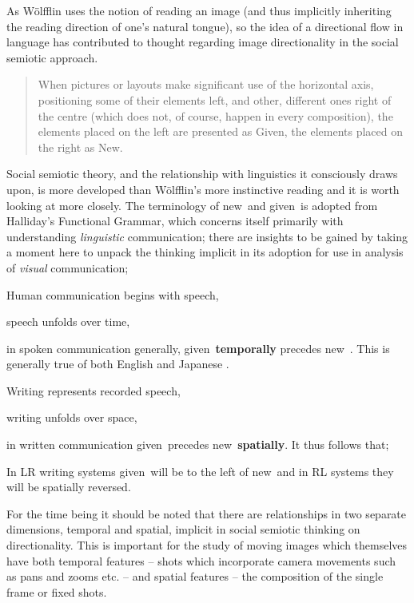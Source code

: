 \documentclass[11pt, oneside, a4paper]{scrartcl}
\newcommand{\nw} {{\sc new}}
\newcommand{\gv} {{\sc given}}
\newenvironment{close_enum}{
\begin{enumerate}
 \setlength{\itemsep}{1pt}
 \setlength{\parskip}{1pt}
 \setlength{\parsep}{0pt}}{\end{enumerate}
}
\begin{document}
As W\"{o}lfflin uses the notion of reading an image (and thus implicitly inheriting the reading direction of one's natural tongue), so the idea of a directional flow in language has contributed to thought regarding image directionality in the social semiotic approach.

\begin{quote}
When pictures or layouts make significant use of the horizontal axis, positioning some of their elements left, and other, different ones right of the centre (which does not, of course, happen in every composition), the elements placed on the left are presented as Given, the elements placed on the right as New.\\ \citep[180--1]{Kress:2006}
\end{quote}


Social semiotic theory, and the relationship with linguistics it consciously draws upon, is more developed than W\"{o}lfflin's more instinctive reading and it is worth looking at more closely. The terminology of \nw\ and \gv\ is adopted from Halliday's Functional Grammar, which concerns itself primarily with understanding \emph{linguistic} communication; there are insights to be gained by taking a moment here to unpack the thinking implicit in its adoption for use in analysis of \emph{visual} communication;

\begin{close_enum}
\item Human communication begins with speech, 
\item speech unfolds over time, 
\item in spoken communication generally, \gv\ {\bf temporally} precedes \nw\ \citep[89]{Halliday:2004}. This is generally true of both English and Japanese \citep[50--1]{Teruya:2007}.
\item Writing represents recorded speech, 
\item writing unfolds over space, 
\item in written communication \gv\ precedes \nw\ {\bf spatially}. \newline It thus follows that;  
\item In LR writing systems \gv\ will be to the left of \nw\ and in RL systems they will be spatially reversed.
\end{close_enum}

For the time being it should be noted that there are relationships in two separate dimensions, temporal and spatial, implicit in social semiotic thinking on directionality. This is important for the study of moving images which themselves have both temporal features -- shots which incorporate camera movements such as pans and zooms etc. -- and spatial features -- the composition of the single frame or fixed shots.
\end{document}
